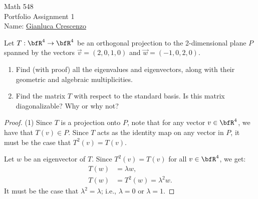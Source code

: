 \documentclass[10pt,twoside,openany]{memoir}
\begin{document}
\begin{center}
    {\Large Math 548 \\[0.1in]Portfolio Assignment 1}\\[.175in]
    {Name:} {\underline{Gianluca Crescenzo\hspace*{2in}}}\\[0.15in]
    \end{center}
    \vspace{4pt}
\begin{problem}
Let $T:\bfR^4 \rightarrow \bfR^4$ be an orthogonal projection to the 2-dimensional plane $P$ spanned by the vectors $\vec{v} = (2,0,1,0)$ and $\vec{w} = (-1,0,2,0)$.
    \begin{enumerate}[label = (\arabic*),itemsep=1pt,topsep=3pt]
        \item Find (with proof) all the eigenvalues and eigenvectors, along with their geometric and algebraic multiplicities.
        \item Find the matrix $T$ with respect to the standard basis. Is this matrix diagonalizable? Why or why not?
    \end{enumerate}
\end{problem}
    \begin{proof}
        (1) Since $T$ is a projection onto $P$, note that for any vector $v \in \bfR^4$, we have that $T(v) \in P$. Since $T$ acts as the identity map on any vector in $P$, it must be the case that $T^2(v) = T(v)$. 

        Let $w$ be an eigenvector of $T$. Since $T^2(v) = T(v)$ for all $v \in \bfR^4$, we get:
            \begin{equation*}
            \begin{split}
                T(w) &= \lambda w, \\
                T(w) & = T^2(w)  = \lambda^2 w.
            \end{split}
            \end{equation*}
        It must be the case that $\lambda^2 = \lambda$; i.e., $\lambda = 0$ or $\lambda = 1$. 
        
    \end{proof}
\begin{problem}

\end{problem}
\end{document}
